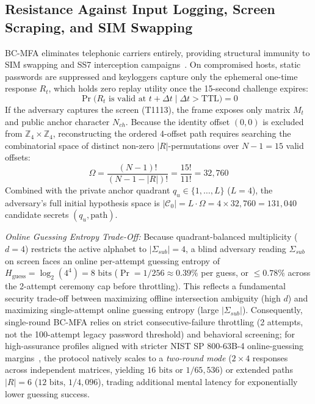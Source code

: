 \subsection{Resistance Against Input Logging, Screen Scraping, and SIM Swapping}
BC-MFA eliminates telephonic carriers entirely, providing structural immunity to SIM swapping and SS7 interception campaigns~\cite{nahapetyan2024sms}. On compromised hosts, static passwords are suppressed and keyloggers capture only the ephemeral one-time response $R_t$, which holds zero replay utility once the 15-second challenge expires:
\begin{equation}
\Pr\big(R_t \text{ is valid at } t + \Delta t \;\big|\; \Delta t > \text{TTL}\big) = 0
\label{eq:ttl}
\end{equation}
If the adversary captures the screen (T1113), the frame exposes only matrix $M_t$ and public anchor character $N_{ch}$. Because the identity offset $(0,0)$ is excluded from $\mathbb{Z}_4 \times \mathbb{Z}_4$, reconstructing the ordered 4-offset path requires searching the combinatorial space of distinct non-zero $|R|$-permutations over $N - 1 = 15$ valid offsets:
\begin{equation}
\Omega = \frac{(N - 1)!}{(N - 1 - |R|)!} = \frac{15!}{11!} = 32{,}760
\label{eq:omega}
\end{equation}
Combined with the private anchor quadrant $q_u \in \{1, \dots, L\}$ ($L = 4$), the adversary's full initial hypothesis space is $|\mathcal{C}_0| = L \cdot \Omega = 4 \times 32{,}760 = 131{,}040$ candidate secrets $(q_u, \text{path})$.

\textit{Online Guessing Entropy Trade-Off:} Because quadrant-balanced multiplicity ($d = 4$) restricts the active alphabet to $|\Sigma_{sub}| = 4$, a blind adversary reading $\Sigma_{sub}$ on screen faces an online per-attempt guessing entropy of $H_{\text{guess}} = \log_2(4^4) = 8\text{ bits}$ ($\Pr = 1/256 \approx 0.39\%$ per guess, or $\le 0.78\%$ across the 2-attempt ceremony cap before throttling). This reflects a fundamental security trade-off between maximizing offline intersection ambiguity (high $d$) and maximizing single-attempt online guessing entropy (large $|\Sigma_{sub}|$). Consequently, single-round BC-MFA relies on strict consecutive-failure throttling (2 attempts, not the 100-attempt legacy password threshold) and behavioral screening; for high-assurance profiles aligned with stricter NIST SP 800-63B-4 online-guessing margins~\cite{nist80063b4}, the protocol natively scales to a \emph{two-round mode} ($2 \times 4$ responses across independent matrices, yielding $16\text{ bits}$ or $1/65{,}536$) or extended paths $|R| = 6$ ($12\text{ bits}$, $1/4{,}096$), trading additional mental latency for exponentially lower guessing success.

